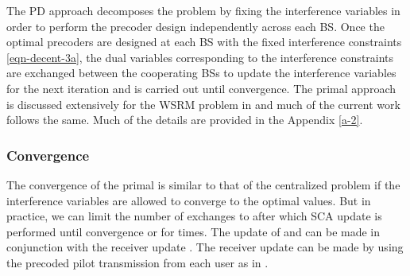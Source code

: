 
The \acl{PD} approach decomposes the problem by fixing the interference variables  in order to perform the precoder design independently across each \ac{BS}. Once the optimal precoders are designed at each \ac{BS} with the fixed interference constraints \eqref{eqn-decent-3a}, the dual variables corresponding to the interference constraints are exchanged between the cooperating \acp{BS}  to update the interference variables  for the next iteration and is carried out until convergence. The primal approach is discussed extensively for the \ac{WSRM} problem in \cite{pennanen2011decentralized} and much of the current work follows the same. Much of the details are provided in the Appendix \ref{a-2}.

\subsubsection*{Convergence}
The convergence of the primal is similar to that of the centralized problem if the interference variables  are allowed to converge to the optimal values. But in practice, we can limit the number of exchanges to  after which \ac{SCA} update is performed until convergence or for  times. The update of  and  can be made in conjunction with the receiver update . The receiver update can be made by using the precoded pilot transmission from each user as in \cite{komulainen2013effective}. 